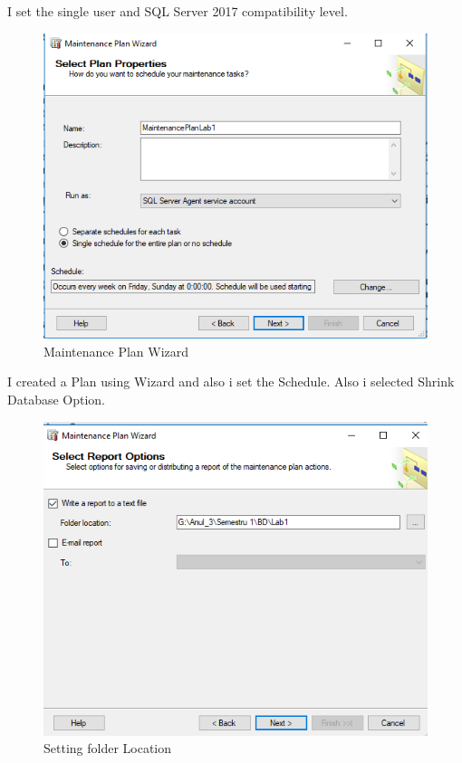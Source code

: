 \documentclass[12pt]{article}
\begin{document}
        I set the single user and SQL Server 2017 compatibility level.        
        \begin{figure}[H]
                \centering
                \includegraphics[width=.95\textwidth]{img5.png}
                \caption{Maintenance Plan Wizard}
        \end{figure}
        \vspace{0.5 cm}
        I created a Plan using Wizard and also i set the Schedule.
        Also i selected Shrink Database Option.
        
        \begin{figure}[H]
                \centering
                \includegraphics[width=.95\textwidth]{img8.png}
                \caption{Setting folder Location}
        \end{figure}
        \vspace{0.5 cm}
\end{document}
